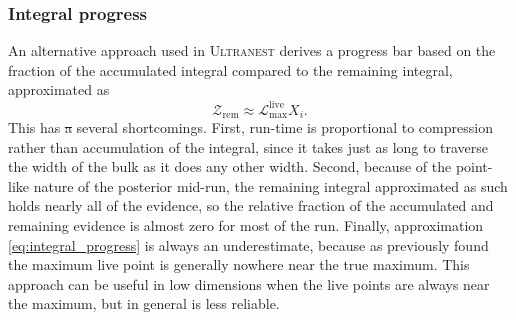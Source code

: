 \documentclass[usenatbib]{mnras}
\newcommand{\Like}{\mathcal{L}}
\providecommand{\DIFdeltex}[1]{{\protect\color{red}\sout{#1}}}                      %
\providecommand{\DIFdelbegin}{} %
\providecommand{\DIFdelend}{} %
\providecommand{\DIFdel}[1]{\texorpdfstring{\DIFdeltex{#1}}{}} %
\newcommand{\DIFscaledelfig}{0.5}
\newlength{\DIFdelgraphicswidth} %
\newlength{\DIFdelgraphicsheight} %
\newcommand{\DIFdelincludegraphics}[2][]{%
\sbox{\DIFdelgraphicsbox}{\DIFOincludegraphics[#1]{#2}}%
\settoboxwidth{\DIFdelgraphicswidth}{\DIFdelgraphicsbox} %
\settoboxtotalheight{\DIFdelgraphicsheight}{\DIFdelgraphicsbox} %
\scalebox{\DIFscaledelfig}{%
\parbox[b]{\DIFdelgraphicswidth}{\usebox{\DIFdelgraphicsbox}\\[-\baselineskip] \rule{\DIFdelgraphicswidth}{0em}}\llap{\resizebox{\DIFdelgraphicswidth}{\DIFdelgraphicsheight}{%
\setlength{\unitlength}{\DIFdelgraphicswidth}%
\begin{picture}(1,1)%
\thicklines\linethickness{2pt} %
{\color[rgb]{1,0,0}\put(0,0){\framebox(1,1){}}}%
{\color[rgb]{1,0,0}\put(0,0){\line( 1,1){1}}}%
{\color[rgb]{1,0,0}\put(0,1){\line(1,-1){1}}}%
\end{picture}%
}\hspace*{3pt}}} %
} %
\DeclareRobustCommand{\DIFdelbegin}{\DIFOdelbegin \let\includegraphics\DIFdelincludegraphics} %
\DeclareRobustCommand{\DIFdelend}{\DIFOaddend \let\includegraphics\DIFOincludegraphics} %
\begin{document}
\subsubsection{Integral progress}
An alternative approach used in \textsc{Ultranest} \citep{ultranest} derives a progress bar based on the fraction of the accumulated integral compared to the remaining integral, approximated as 
\begin{equation}\label{eq:integral_progress}
    \mathcal{Z}_\mathrm{rem} \approx \Like_\mathrm{max}^{\mathrm{live}} X_i.
\end{equation}
This has \DIFdelbegin \DIFdel{a }\DIFdelend several shortcomings. First, run-time is proportional to compression rather than accumulation of the integral, since it takes just as long to traverse the width of the bulk as it does any other width. Second, because of the point-like nature of the posterior mid-run, the remaining integral approximated as such holds nearly all of the evidence, so the relative fraction of the accumulated and remaining evidence is almost zero for most of the run. Finally, approximation \cref{eq:integral_progress} is always an underestimate, because as previously found the maximum live point is generally nowhere near the true maximum. This approach can be useful in low dimensions when the live points are always near the maximum, but in general is less reliable.
\end{document}
